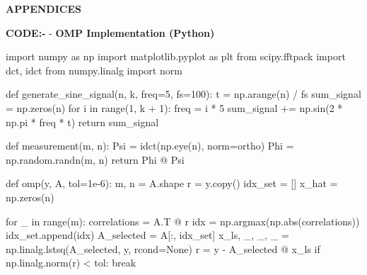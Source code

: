 \documentclass[
  letterpaper,
  DIV=11,
  numbers=noendperiod]{scrartcl}
\newenvironment{Shaded}{\begin{snugshade}}{\end{snugshade}}
\newcommand{\BuiltInTok}[1]{\textcolor[rgb]{0.40,0.85,0.94}{#1}}
\newcommand{\ControlFlowTok}[1]{\textcolor[rgb]{0.98,0.15,0.45}{#1}}
\newcommand{\DecValTok}[1]{\textcolor[rgb]{0.68,0.51,1.00}{#1}}
\newcommand{\FloatTok}[1]{\textcolor[rgb]{0.68,0.51,1.00}{#1}}
\newcommand{\ImportTok}[1]{\textcolor[rgb]{0.98,0.15,0.45}{#1}}
\newcommand{\KeywordTok}[1]{\textcolor[rgb]{0.98,0.15,0.45}{#1}}
\newcommand{\NormalTok}[1]{\textcolor[rgb]{0.97,0.97,0.95}{#1}}
\newcommand{\OperatorTok}[1]{\textcolor[rgb]{0.97,0.97,0.95}{#1}}
\newcommand{\StringTok}[1]{\textcolor[rgb]{0.90,0.86,0.45}{#1}}
\newcommand{\VariableTok}[1]{\textcolor[rgb]{0.97,0.97,0.95}{#1}}
\providecommand{\mainsection}[1]{\begin{center}{\rmfamily\textbf{\fontsize{14}{20}\selectfont #1}}\end{center}}
\begin{document}
\printbibliography[heading=none]

\newpage

\mainsection{APPENDICES}

\textbf{CODE:-} - \textbf{OMP Implementation (Python)}

\begin{Shaded}
\begin{Highlighting}[]
\ImportTok{import}\NormalTok{ numpy }\ImportTok{as}\NormalTok{ np}
\ImportTok{import}\NormalTok{ matplotlib.pyplot }\ImportTok{as}\NormalTok{ plt}
\ImportTok{from}\NormalTok{ scipy.fftpack }\ImportTok{import}\NormalTok{ dct, idct}
\ImportTok{from}\NormalTok{ numpy.linalg }\ImportTok{import}\NormalTok{ norm}

\KeywordTok{def}\NormalTok{ generate\_sine\_signal(n, k, freq}\OperatorTok{=}\DecValTok{5}\NormalTok{, fs}\OperatorTok{=}\DecValTok{100}\NormalTok{):}
\NormalTok{    t }\OperatorTok{=}\NormalTok{ np.arange(n) }\OperatorTok{/}\NormalTok{ fs}
\NormalTok{    sum\_signal }\OperatorTok{=}\NormalTok{ np.zeros(n)}
    \ControlFlowTok{for}\NormalTok{ i }\KeywordTok{in} \BuiltInTok{range}\NormalTok{(}\DecValTok{1}\NormalTok{, k }\OperatorTok{+} \DecValTok{1}\NormalTok{):}
\NormalTok{        freq }\OperatorTok{=}\NormalTok{ i }\OperatorTok{*} \DecValTok{5}
\NormalTok{        sum\_signal }\OperatorTok{+=}\NormalTok{ np.sin(}\DecValTok{2} \OperatorTok{*}\NormalTok{ np.pi }\OperatorTok{*}\NormalTok{ freq }\OperatorTok{*}\NormalTok{ t)}
    \ControlFlowTok{return}\NormalTok{ sum\_signal}

\KeywordTok{def}\NormalTok{ measurement(m, n):}
\NormalTok{    Psi }\OperatorTok{=}\NormalTok{ idct(np.eye(n), norm}\OperatorTok{=}\StringTok{\textquotesingle{}ortho\textquotesingle{}}\NormalTok{)}
\NormalTok{    Phi }\OperatorTok{=}\NormalTok{ np.random.randn(m, n)}
    \ControlFlowTok{return}\NormalTok{ Phi }\OperatorTok{@}\NormalTok{ Psi}

\KeywordTok{def}\NormalTok{ omp(y, A, tol}\OperatorTok{=}\FloatTok{1e{-}6}\NormalTok{):}
\NormalTok{    m, n }\OperatorTok{=}\NormalTok{ A.shape}
\NormalTok{    r }\OperatorTok{=}\NormalTok{ y.copy()}
\NormalTok{    idx\_set }\OperatorTok{=}\NormalTok{ []}
\NormalTok{    x\_hat }\OperatorTok{=}\NormalTok{ np.zeros(n)}

    \ControlFlowTok{for}\NormalTok{ \_ }\KeywordTok{in} \BuiltInTok{range}\NormalTok{(m):}
\NormalTok{        correlations }\OperatorTok{=}\NormalTok{ A.T }\OperatorTok{@}\NormalTok{ r}
\NormalTok{        idx }\OperatorTok{=}\NormalTok{ np.argmax(np.}\BuiltInTok{abs}\NormalTok{(correlations))}
\NormalTok{        idx\_set.append(idx)}
\NormalTok{        A\_selected }\OperatorTok{=}\NormalTok{ A[:, idx\_set]}
\NormalTok{        x\_ls, \_, \_, \_ }\OperatorTok{=}\NormalTok{ np.linalg.lstsq(A\_selected, y, rcond}\OperatorTok{=}\VariableTok{None}\NormalTok{)}
\NormalTok{        r }\OperatorTok{=}\NormalTok{ y }\OperatorTok{{-}}\NormalTok{ A\_selected }\OperatorTok{@}\NormalTok{ x\_ls}
        \ControlFlowTok{if}\NormalTok{ np.linalg.norm(r) }\OperatorTok{\textless{}}\NormalTok{ tol:}
            \ControlFlowTok{break}


\end{Highlighting}
\end{Shaded}
\end{document}
